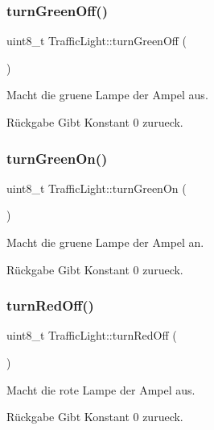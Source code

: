\subsubsection{\texorpdfstring{turn\+Green\+Off()}{turnGreenOff()}}
{\footnotesize\ttfamily uint8\+\_\+t Traffic\+Light\+::turn\+Green\+Off (\begin{DoxyParamCaption}{ }\end{DoxyParamCaption})}

Macht die gruene Lampe der Ampel aus.

\begin{DoxyReturn}{Rückgabe}
Gibt Konstant 0 zurueck. 
\end{DoxyReturn}
\hypertarget{class_traffic_light_a9477c1e61facd79e308b297877e3beee}{}\label{class_traffic_light_a9477c1e61facd79e308b297877e3beee} 
\subsubsection{\texorpdfstring{turn\+Green\+On()}{turnGreenOn()}}
{\footnotesize\ttfamily uint8\+\_\+t Traffic\+Light\+::turn\+Green\+On (\begin{DoxyParamCaption}{ }\end{DoxyParamCaption})}

Macht die gruene Lampe der Ampel an.

\begin{DoxyReturn}{Rückgabe}
Gibt Konstant 0 zurueck. 
\end{DoxyReturn}
\hypertarget{class_traffic_light_a2ca2808ea156abc199a14939c2ab0c92}{}\label{class_traffic_light_a2ca2808ea156abc199a14939c2ab0c92} 
\subsubsection{\texorpdfstring{turn\+Red\+Off()}{turnRedOff()}}
{\footnotesize\ttfamily uint8\+\_\+t Traffic\+Light\+::turn\+Red\+Off (\begin{DoxyParamCaption}{ }\end{DoxyParamCaption})}

Macht die rote Lampe der Ampel aus.

\begin{DoxyReturn}{Rückgabe}
Gibt Konstant 0 zurueck. 
\end{DoxyReturn}
\hypertarget{class_traffic_light_acd3d36d6884744b2230bd234bff27357}{}\label{class_traffic_light_acd3d36d6884744b2230bd234bff27357} 
